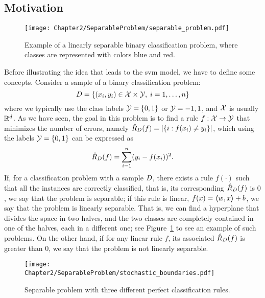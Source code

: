 \subsection{Motivation}
%
\begin{figure}[t!]
    \centering
    \texttt{[image: Chapter2/SeparableProblem/separable\_problem.pdf]}
    \caption{Example of a linearly separable binary classification problem, where classes are represented with colors blue and red.}
    \label{fig:separable_problem}
\end{figure}
Before illustrating the idea that leads to the \acrshort{svm} model, we have to define some concepts. Consider a sample of a binary classification problem:
\begin{equation}
    \nonumber
    D = \left\{(x_i, y_i) \in \mathcal{X} \times \mathcal{Y}, \; i=1, \ldots, n\right\}
\end{equation}
where we typically use the class labels $\mathcal{Y} = \left\{0, 1\right\}$ or $\mathcal{Y}={-1, 1}$, and $\mathcal{X}$ is usually $\mathbb{R}^d$. As we have seen, the goal in this problem is to find a rule $f: \mathcal{X} \to \mathcal{Y}$ that minimizes the number of errors, namely $\hat{R}_{D}(f) = \left|\left\{i: f(x_i) \neq y_i\right\}\right|$, which using the labels $\mathcal{Y} = \left\{0, 1\right\}$ can be expressed as
\begin{equation}
    \nonumber
    \hat{R}_{D}(f) = \sum_{i=1}^n (y_i - f(x_i))^2 .
\end{equation}
If, for a classification problem with a sample $D$, there exists a rule $f(\cdot)$ such that all the instances are correctly classified, that is, its corresponding $\hat{R}_{D}(f)$ is $0$, we say that the problem is separable; if this rule is linear, $f(x) = \bm{\left\langle} w, x \bm{\right\rangle} + b$, we say that the problem is linearly separable. That is, we can find a hyperplane that divides the space in two halves, and the two classes are completely contained in one of the halves, each in a different one; see Figure~\ref{fig:separable_problem} to see an example of such problems.
On the other hand, if for any linear rule $f$, its associated $\hat{R}_{D}(f)$ is greater than $0$, we say that the problem is not linearly separable. 
%
\begin{figure}[t!]
    \centering
    \texttt{[image: Chapter2/SeparableProblem/stochastic\_boundaries.pdf]}
    \caption{Separable problem with three different perfect classification rules.}
    \label{fig:stochastic_boundaries}
\end{figure}

